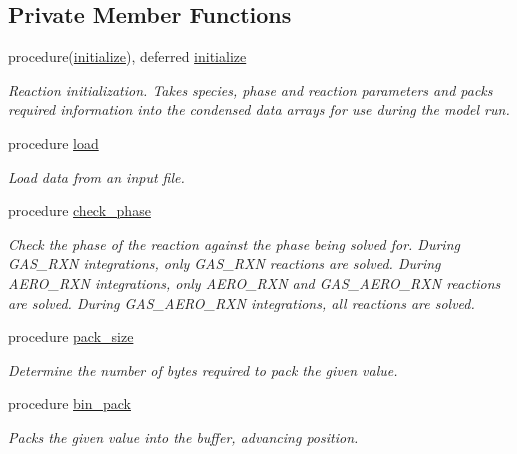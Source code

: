 \subsection*{Private Member Functions}
\begin{DoxyCompactItemize}
\item 
procedure(\mbox{\hyperlink{interfacepmc__aero__rep__data_1_1initialize}{initialize}}), deferred \mbox{\hyperlink{structpmc__rxn__data_1_1rxn__data__t_aec9c7d12273468ac75acce69a13cc93f}{initialize}}
\begin{DoxyCompactList}\small\item\em Reaction initialization. Takes species, phase and reaction parameters and packs required information into the condensed data arrays for use during the model run. \end{DoxyCompactList}\item 
procedure \mbox{\hyperlink{structpmc__rxn__data_1_1rxn__data__t_a2c8a108bceb0fb35cfb0f861ef16ead0}{load}}
\begin{DoxyCompactList}\small\item\em Load data from an input file. \end{DoxyCompactList}\item 
procedure \mbox{\hyperlink{structpmc__rxn__data_1_1rxn__data__t_a2cfdf5f6aedd25000492e6152716ff8a}{check\+\_\+phase}}
\begin{DoxyCompactList}\small\item\em Check the phase of the reaction against the phase being solved for. During G\+A\+S\+\_\+\+R\+XN integrations, only G\+A\+S\+\_\+\+R\+XN reactions are solved. During A\+E\+R\+O\+\_\+\+R\+XN integrations, only A\+E\+R\+O\+\_\+\+R\+XN and G\+A\+S\+\_\+\+A\+E\+R\+O\+\_\+\+R\+XN reactions are solved. During G\+A\+S\+\_\+\+A\+E\+R\+O\+\_\+\+R\+XN integrations, all reactions are solved. \end{DoxyCompactList}\item 
procedure \mbox{\hyperlink{structpmc__rxn__data_1_1rxn__data__t_ac2a32772ed2e5853726fe0d500b86f5d}{pack\+\_\+size}}
\begin{DoxyCompactList}\small\item\em Determine the number of bytes required to pack the given value. \end{DoxyCompactList}\item 
procedure \mbox{\hyperlink{structpmc__rxn__data_1_1rxn__data__t_af896a5a86cfa32f47471d2d32b2cc486}{bin\+\_\+pack}}
\begin{DoxyCompactList}\small\item\em Packs the given value into the buffer, advancing position. \end{DoxyCompactList}\item 

\end{DoxyCompactItemize}
